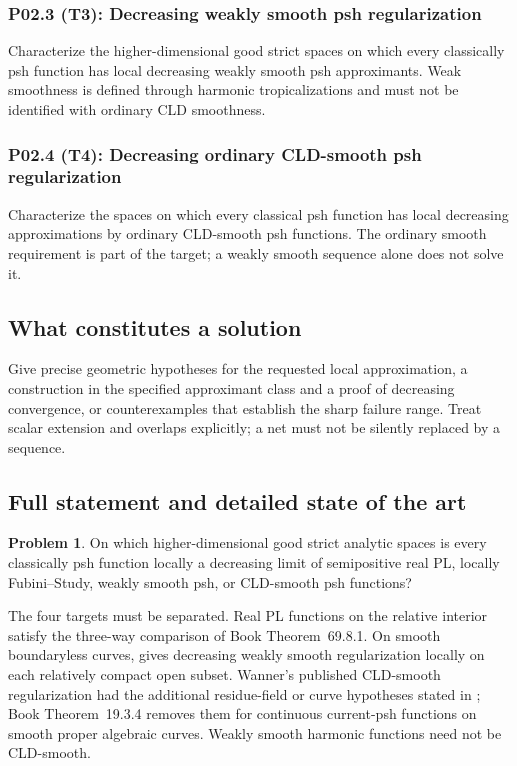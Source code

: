 \documentclass[11pt,a4paper]{article}
\theoremstyle{definition}
\newtheorem{problem}{Problem}[section]
\theoremstyle{remark}
\begin{document}
\subsubsection*{P02.3 (T3): Decreasing weakly smooth psh regularization}
\label{atom:P02.3}
Characterize the higher-dimensional good strict spaces on which every classically psh function has local decreasing weakly smooth psh approximants. Weak smoothness is defined through harmonic tropicalizations and must not be identified with ordinary CLD smoothness.

\subsubsection*{P02.4 (T4): Decreasing ordinary CLD-smooth psh regularization}
\label{atom:P02.4}
Characterize the spaces on which every classical psh function has local decreasing approximations by ordinary CLD-smooth psh functions. The ordinary smooth requirement is part of the target; a weakly smooth sequence alone does not solve it.

\subsection{What constitutes a solution}
Give precise geometric hypotheses for the requested local approximation, a construction in the specified approximant class and a proof of decreasing convergence, or counterexamples that establish the sharp failure range. Treat scalar extension and overlaps explicitly; a net must not be silently replaced by a sequence.

\subsection{Full statement and detailed state of the art}
\label{sec:ch72-classical-regularization}

\begin{problem}\label{prob:frontier-classical-regularization}
On which higher-dimensional good strict analytic spaces is every classically
psh function locally a decreasing limit of semipositive real PL, locally
Fubini--Study, weakly smooth psh, or CLD-smooth psh functions?
\end{problem}

The four targets must be separated.  Real PL functions on the relative
interior satisfy the three-way comparison of
Book Theorem~69.8.1.  On smooth boundaryless curves,
\cite[Proposition~15.11]{GJR26} gives decreasing weakly smooth
regularization locally on each relatively compact open subset.  Wanner's
published CLD-smooth regularization had the additional residue-field or curve
hypotheses stated in \cite[Corollary~5.4]{Wanner19};
Book Theorem~19.3.4 removes them for
continuous current-psh functions on smooth proper algebraic curves.
Weakly smooth harmonic functions need not be CLD-smooth.
\end{document}
